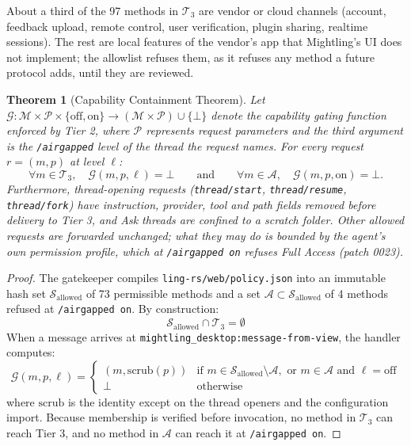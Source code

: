 \documentclass[11pt]{article}
\newtheorem{theorem}{Theorem}
\newcommand{\code}[1]{\texttt{#1}}
\newcommand{\agon}{\code{/airgapped on}}
\begin{document}
About a third of the 97 methods in $\mathcal{T}_3$ are vendor or cloud channels (account, feedback upload, remote
control, user verification, plugin sharing, realtime sessions). The rest are local features of the vendor's app that
Mightling's UI does not implement; the allowlist refuses them, as it refuses any method a future protocol adds, until
they are reviewed.

\begin{theorem}[Capability Containment Theorem]
Let $\mathcal{G}: \mathcal{M} \times \mathcal{P} \times \{\text{off}, \text{on}\} \to (\mathcal{M} \times \mathcal{P}) \cup \{\bot\}$
denote the capability gating function enforced by Tier 2, where $\mathcal{P}$ represents request parameters and the
third argument is the \code{/airgapped} level of the thread the request names. For every request $r = (m, p)$ at level $\ell$:
\begin{equation}
\forall m \in \mathcal{T}_3, \quad \mathcal{G}(m, p, \ell) = \bot
\qquad\text{and}\qquad
\forall m \in \mathcal{A}, \quad \mathcal{G}(m, p, \text{on}) = \bot .
\end{equation}
Furthermore, thread-opening requests (\code{thread/start}, \code{thread/resume}, \code{thread/fork}) have instruction,
provider, tool and path fields removed before delivery to Tier 3, and Ask threads are confined to a scratch folder.
Other allowed requests are forwarded unchanged; what they may do is bounded by the agent's own permission profile,
which at \agon{} refuses Full Access (patch 0023).
\end{theorem}

\begin{proof}
The gatekeeper compiles \code{ling-rs/web/policy.json} into an immutable hash set $\mathcal{S}_{\text{allowed}}$ of 73
permissible methods and a set $\mathcal{A} \subset \mathcal{S}_{\text{allowed}}$ of 4 methods refused at \agon. By construction:
\begin{equation}
\mathcal{S}_{\text{allowed}} \cap \mathcal{T}_3 = \emptyset
\end{equation}
When a message arrives at \code{mightling\_desktop:}\allowbreak\code{message-from-view}, the handler computes:
\begin{equation}
\mathcal{G}(m, p, \ell) =
\begin{cases}
(m, \text{scrub}(p)) & \text{if } m \in \mathcal{S}_{\text{allowed}} \setminus \mathcal{A}, \text{ or } m \in \mathcal{A} \text{ and } \ell = \text{off} \\
\bot & \text{otherwise}
\end{cases}
\end{equation}
where $\text{scrub}$ is the identity except on the thread openers and the configuration import. Because membership is
verified before invocation, no method in $\mathcal{T}_3$ can reach Tier 3, and no method in $\mathcal{A}$ can reach it
at \agon.
\end{proof}
\end{document}

